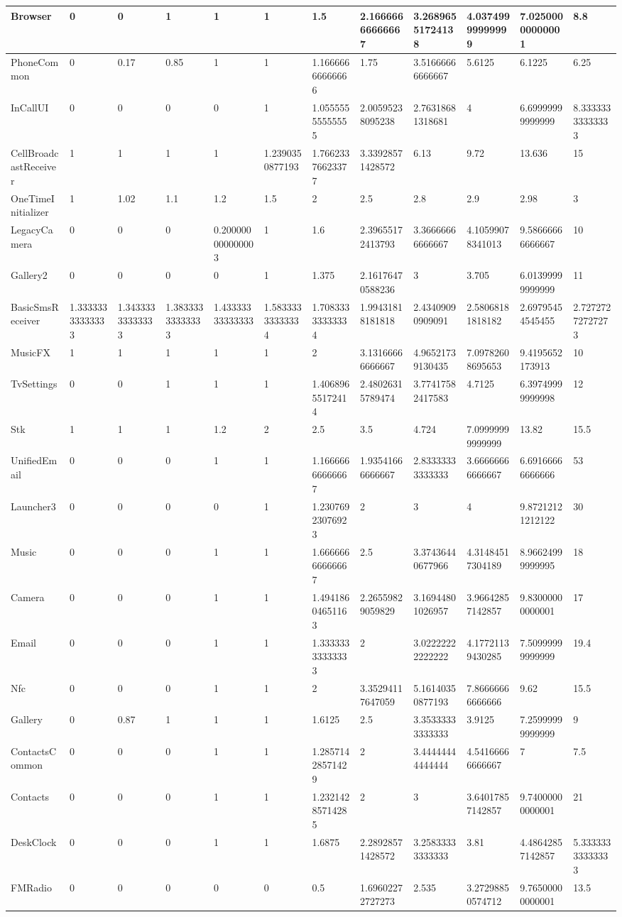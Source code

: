 \begin{tabular}{|l|l|l|l|l|l|l|l|l|l|l|l|}
\hline
Browser&0&0&1&1&1&1.5&2.16666666666667&3.26896551724138&4.03749999999999&7.02500000000001&8.8\\
\hline
PhoneCommon&0&0.17&0.85&1&1&1.16666666666666&1.75&3.51666666666667&5.6125&6.1225&6.25\\
\hline
InCallUI&0&0&0&0&1&1.05555555555555&2.00595238095238&2.76318681318681&4&6.69999999999999&8.33333333333333\\
\hline
CellBroadcastReceiver&1&1&1&1&1.2390350877193&1.76623376623377&3.33928571428572&6.13&9.72&13.636&15\\
\hline
OneTimeInitializer&1&1.02&1.1&1.2&1.5&2&2.5&2.8&2.9&2.98&3\\
\hline
LegacyCamera&0&0&0&0.200000000000003&1&1.6&2.39655172413793&3.36666666666667&4.10599078341013&9.58666666666667&10\\
\hline
Gallery2&0&0&0&0&1&1.375&2.16176470588236&3&3.705&6.01399999999999&11\\
\hline
BasicSmsReceiver&1.33333333333333&1.34333333333333&1.38333333333333&1.43333333333333&1.58333333333334&1.70833333333334&1.99431818181818&2.43409090909091&2.58068181818182&2.69795454545455&2.72727272727273\\
\hline
MusicFX&1&1&1&1&1&2&3.13166666666667&4.96521739130435&7.09782608695653&9.4195652173913&10\\
\hline
TvSettings&0&0&1&1&1&1.40689655172414&2.48026315789474&3.77417582417583&4.7125&6.39749999999998&12\\
\hline
Stk&1&1&1&1.2&2&2.5&3.5&4.724&7.09999999999999&13.82&15.5\\
\hline
UnifiedEmail&0&0&0&1&1&1.16666666666667&1.93541666666667&2.83333333333333&3.66666666666667&6.69166666666666&53\\
\hline
Launcher3&0&0&0&0&1&1.23076923076923&2&3&4&9.87212121212122&30\\
\hline
Music&0&0&0&1&1&1.66666666666667&2.5&3.37436440677966&4.31484517304189&8.96624999999995&18\\
\hline
Camera&0&0&0&1&1&1.49418604651163&2.26559829059829&3.16944801026957&3.96642857142857&9.83000000000001&17\\
\hline
Email&0&0&0&1&1&1.33333333333333&2&3.02222222222222&4.17721139430285&7.50999999999999&19.4\\
\hline
Nfc&0&0&0&1&1&2&3.35294117647059&5.16140350877193&7.86666666666666&9.62&15.5\\
\hline
Gallery&0&0.87&1&1&1&1.6125&2.5&3.35333333333333&3.9125&7.25999999999999&9\\
\hline
ContactsCommon&0&0&0&1&1&1.28571428571429&2&3.44444444444444&4.54166666666667&7&7.5\\
\hline
Contacts&0&0&0&1&1&1.23214285714285&2&3&3.64017857142857&9.74000000000001&21\\
\hline
DeskClock&0&0&0&1&1&1.6875&2.28928571428572&3.25833333333333&3.81&4.48642857142857&5.33333333333333\\
\hline
FMRadio&0&0&0&0&0&0.5&1.69602272727273&2.535&3.27298850574712&9.76500000000001&13.5\\
\hline
\end{tabular}
